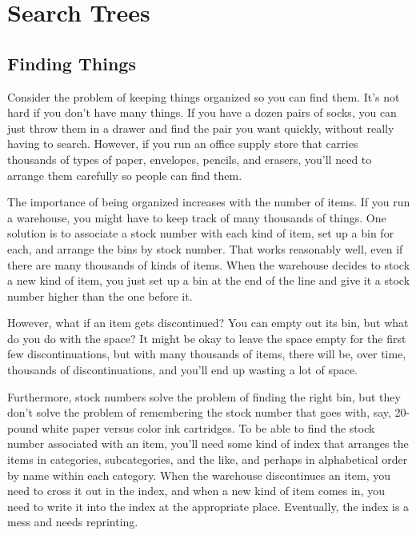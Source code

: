 \chapter{Search Trees}
\label{ch:search-trees}

\section{Finding Things}

Consider the problem of keeping things organized so you can find them.
It's not hard if you don't have many things.
If you have a dozen pairs of socks, you can just throw them in a drawer
and find the pair you want quickly, without really having to search.
However, if you run an office supply store that carries thousands of
types of paper, envelopes, pencils, and erasers,
you'll need to arrange them carefully so people can find them.

The importance of being organized increases with the number of items.
If you run a warehouse, you might have to keep track of many thousands of things.
One solution is to associate a stock number with each
kind of item, set up a bin for each, and arrange the bins by
stock number.
That works reasonably well, even if there are many thousands of kinds of items.
When the warehouse decides to stock a new kind of item, you just set up
a bin at the end of the line and give it a stock number higher than the
one before it.

However, what if an item gets discontinued?
You can empty out its bin, but what do you do with the space?
It might be okay to leave the space empty for the first few discontinuations,
but with many thousands of items, there will be, over time, thousands
of discontinuations, and you'll end up wasting a lot of space.

Furthermore, stock numbers solve the problem of finding the
right bin, but they don't solve the problem of remembering the stock number
that goes with, say, 20-pound white paper versus color ink cartridges.
To be able to find the stock number associated with
an item, you'll need some kind of index that arranges the items in
categories, subcategories, and the like, and perhaps in alphabetical
order by name within each category.
When the warehouse discontinues an item,
you need to cross it out in the index,
and when a new kind of item comes in, you need to write it into
the index at the appropriate place.
Eventually, the index is a mess and needs reprinting.

